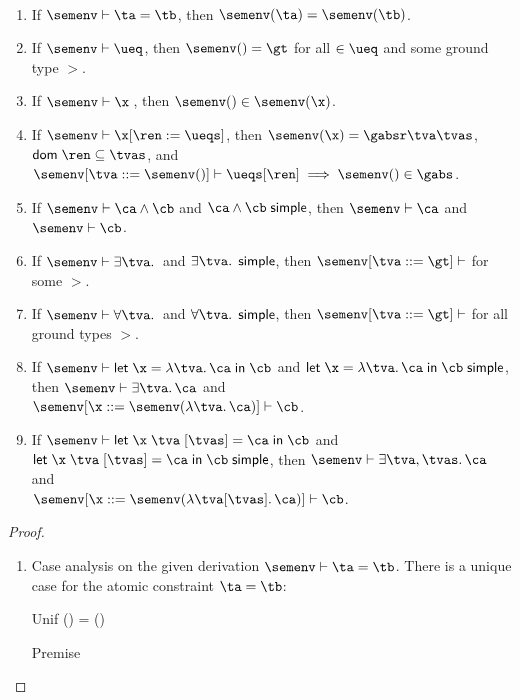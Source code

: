 \documentclass[acmsmall,screen,nonacm,review]{acmart}
\begin{document}
\begin{lemma}~
  \label{lem:simple-inversion}
  \begin{enumerate}[(\roman*)]
    \item If $\semenv \th \cunif \ta \tb$, then $\semenv(\ta) = \semenv(\tb)$.
    \item If $\semenv \th \ueq$, then $\semenv(\t) = \gt$ for all $\t \in \ueq$ and some ground type $\gt$.
    \item If $\semenv \th \capp \x \t$, then $\semenv(\t) \in \semenv(\x)$.
    \item If $\semenv \th \cpapp \x \ren \ueqs$, then $\semenv(\x) = \gabsr \tv \tvs$, $\dom \ren \subseteq \tvs$, and \\$\semenv\where{\tv \is \semenv(\t)} \th \ueqs\where\ren \implies \semenv(\t) \in \gabs$.

    \item If $\semenv \th \ca \cand \cb$ and $\ca \cand \cb \simple$, then $\semenv \th \ca$ and $\semenv \th \cb$.
    \item If $\semenv \th \cexists \tv \c$ and $\cexists \tv \c \simple$, then $\semenv\where{\tv \is \gt} \th \c$ for some $\gt$.
    \item If $\semenv \th \cfor \tv \c$ and $\cfor \tv \c \simple$, then $\semenv\where{\tv \is \gt} \th \c$ for all ground types $\gt$.
    \item If $\semenv \th \clet \x \tv \ca \cb$ and $\clet \x \tv \ca \cb \simple$, then $\semenv \th \cexists \tv \ca$ and \\$\semenv\where{\x \is \semenv(\cabs \tv \ca)} \th \cb$.
    \item If $\semenv \th \cletr \x \tv \tvs \ca \cb$ and $\cletr \x \tv \tvs \ca \cb \simple$, then
      $\semenv \th \cexists {\tv, \tvs} \ca$ and \\$\semenv\where{\x \is \semenv(\cabsr \tv \tvs \ca)} \th \cb$.
  \end{enumerate}
  \begin{proof}~
    \begin{enumerate}[(\roman*)]
      \item Case analysis on the given derivation $\semenv \th \cunif \ta \tb$.
	There is a unique case for the atomic constraint $\cunif \ta \tb$:
	\begin{proofcases}
	    \proofcasederivation
	      {Unif}
	      {\semenv(\ta) = \semenv(\tb)}
	      {\semenv \th \cunif \ta \tb}

	    \begin{llproof}
\Hand 		\eqPf{\semenv(\ta)}{\semenv(\tb)}  {Premise}
	    \end{llproof}
	\end{proofcases}


\end{enumerate}
\end{proof}
\end{lemma}
\end{document}
